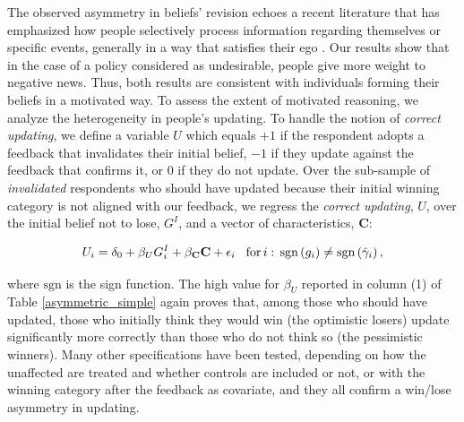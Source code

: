 \documentclass[12pt]{article} %
\begin{document}
The observed asymmetry in beliefs' revision echoes a recent literature that has emphasized how people selectively process information regarding themselves or specific events, generally in a way that satisfies their ego \citep[][]{eil_good_2011,mobius_et_al_2011,sharot_et_al_2011}. Our results show that in the case of a policy considered as undesirable, people give more weight to negative news. Thus, both results are consistent with individuals forming their beliefs in a motivated way. To assess the extent of motivated reasoning, we analyze the heterogeneity in people's updating. To handle the notion of \textit{correct updating}, we define a variable $U$ which equals $+1$ if the respondent adopts a feedback that invalidates their initial belief, $-1$ if they update against the feedback that confirms it, or $0$ if they do not update. Over the sub-sample of \textit{invalidated} respondents who should have updated because their initial winning category is not aligned with our feedback, we regress the \textit{correct updating}, $U$, over the initial belief not to lose, $G^I$, and a vector of characteristics, \textbf{C}:

\begin{equation}
	U_{i} = \delta_{0}+\beta_{U}G^I_{i}+\mathbf{\beta_C C}+\epsilon_{i}\hspace{0.3cm} \text{for}\,i:\,\text{sgn}\left(g_i\right)\neq\text{sgn}\left(\hat{\gamma}_i\right),
\end{equation}

\noindent
where $\text{sgn}$ is the sign function. The high value for $\beta_{U}$ reported in column (1) of Table \ref{asymmetric_simple} again proves that, among those who should have updated, those who initially think they would win (the optimistic losers) update significantly more correctly than those who do not think so (the pessimistic winners). Many other specifications have been tested, depending on how the unaffected are treated and whether controls are included or not, or with the winning category after the feedback as covariate, and they all confirm a win/lose asymmetry in updating.

\end{document}
